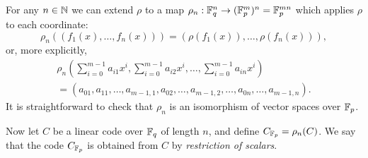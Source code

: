 \documentclass[12pt]{amsart}
\begin{document}
For any $n\in{\mathbb N}$ we can extend $\rho$ to a map $\rho_n:{\mathbb F}_q^n \to ({\mathbb F}_p^m)^n={\mathbb F}_p^{mn}$ which applies $\rho$ to each coordinate:
$$\rho_n((f_1(x),\ldots, f_n(x)))=(\rho(f_1(x)),\ldots,\rho(f_n(x))),$$
or, more explicitly,
\begin{multline*}
\rho_n(\sum\limits_{i=0}^{m-1}a_{i1} x^i,\sum\limits_{i=0}^{m-1}a_{i2} x^i,\ldots,\sum\limits_{i=0}^{m-1}a_{in} x^i)
\\
=(a_{01},a_{11},\ldots,a_{m-1,1}, a_{02},\ldots, a_{m-1,2},\ldots,a_{0n},\ldots,a_{m-1,n}).
\end{multline*}
It is straightforward to check that $\rho_n$ is an isomorphism of vector spaces over ${\mathbb F}_p$.

Now let $C$ be a linear code over ${\mathbb F}_q$ of length $n$, and define $C_{{\mathbb F}_p}=\rho_n(C)$. We say that the code $C_{{\mathbb F}_p}$ is obtained from $C$ by {\it restriction of scalars}. 
\end{document}
